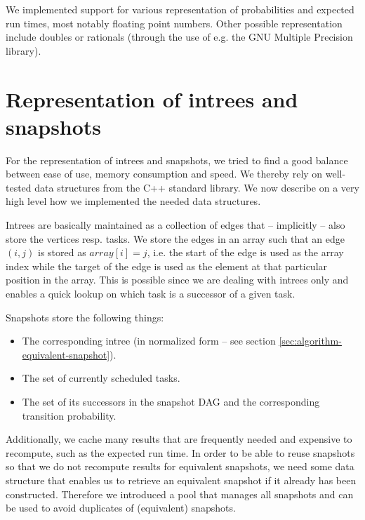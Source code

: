 \label{sec:implementation-numbers}
We implemented support for various representation of probabilities and expected run times, most notably floating point numbers. Other possible representation include doubles or rationals (through the use of e.g. the GNU Multiple Precision library).

\section{Representation of intrees and snapshots}
\label{sec:implementation-repr-intrees-snapshots}

For the representation of intrees and snapshots, we tried to find a good balance between ease of use, memory consumption and speed. We thereby rely on well-tested data structures from the C++ standard library. We now describe on a very high level how we implemented the needed data structures.

Intrees are basically maintained as a collection of edges that -- implicitly -- also store the vertices resp. tasks. We store the edges in an array such that an edge $(i,j)$ is stored as $array[i]=j$, i.e. the start of the edge is used as the array index while the target of the edge is used as the element at that particular position in the array. This is possible since we are dealing with intrees only and enables a quick lookup on which task is a successor of a given task.

Snapshots store the following things:
\begin{itemize}
\item The corresponding intree (in normalized form -- see section \ref{sec:algorithm-equivalent-snapshot}).
\item The set of currently scheduled tasks.
\item The set of its successors in the snapshot DAG and the corresponding transition probability.
\end{itemize}

Additionally, we cache many results that are frequently needed and expensive to recompute, such as the expected run time. In order to be able to reuse snapshots so that we do not recompute results for equivalent snapshots, we need some data structure that enables us to retrieve an equivalent snapshot if it already has been constructed. Therefore we introduced a pool that manages all snapshots and can be used to avoid duplicates of (equivalent) snapshots.

\newcommand{\treegeq}[1][X]{\stackrel{\text{#1}}{\geq}}

